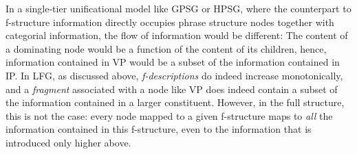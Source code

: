 \documentclass[output=paper,hidelinks]{langscibook}
\begin{document}
 \begin{exe}
 \ex\label{ex:mapping}
\end{exe}
 In a single-tier unificational model like GPSG or HPSG, where the counterpart to f-structure information directly occupies phrase structure nodes together with categorial information, the flow of information would be different: The content of a dominating node would be a function of the content of its children, hence, information contained in VP would be a subset of the information contained in IP. In LFG, as discussed above, \textit{f-descriptions} do indeed increase monotonically, and a \textit{fragment} associated with a node like VP does indeed contain a subset of the information contained in a larger constituent. However, in the full structure, this is not the case: every node mapped to a given f-structure maps to \textit{all} the information contained in this f-structure, even to the information that is introduced only higher above.
\end{document}
